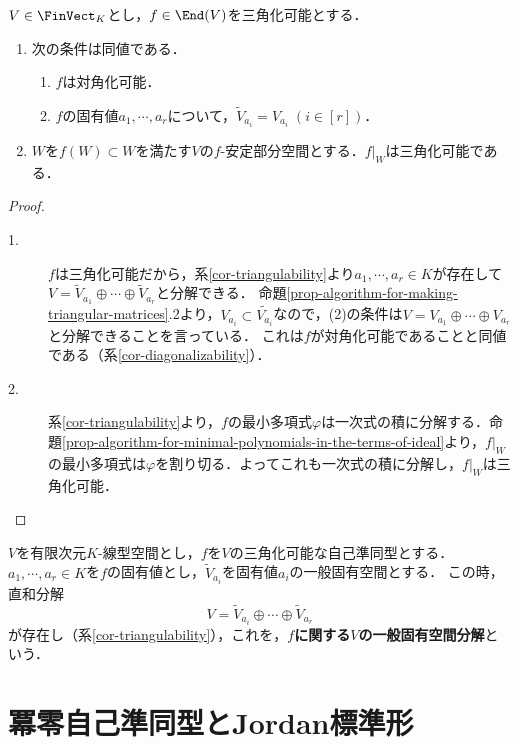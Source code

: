 \documentclass[uplatex, dvipdfmx]{jsreport}
\begin{document}
\begin{corollary}
    $V\in\FinVect_K$とし，$f\in\End(V)$を三角化可能とする．
    \begin{enumerate}
        \item 次の条件は同値である．
        \begin{enumerate}[(1)]
            \item $f$は対角化可能．
            \item $f$の固有値$a_1,\cdots,a_r$について，$\widetilde{V}_{a_i}=V_{a_i}\;(i\in[r])$．
        \end{enumerate}
        \item $W$を$f(W)\subset W$を満たす$V$の$f$-安定部分空間とする．$f|_W$は三角化可能である．
    \end{enumerate}
\end{corollary}
\begin{proof}\mbox{}
    \begin{description}
        \item[1.] $f$は三角化可能だから，系\ref{cor-triangulability}より$a_1,\cdots,a_r\in K$が存在して$V=\tilde{V}_{a_1}\oplus\cdots\oplus \tilde{V}_{a_r}$と分解できる．
        命題\ref{prop-algorithm-for-making-triangular-matrices}.2より，$V_{a_i}\subset\tilde{V_{a_i}}$なので，(2)の条件は$V=V_{a_1}\oplus\cdots\oplus V_{a_r}$と分解できることを言っている．
        これは$f$が対角化可能であることと同値である（系\ref{cor-diagonalizability}）．
        \item[2.] 系\ref{cor-triangulability}より，$f$の最小多項式$\varphi$は一次式の積に分解する．命題\ref{prop-algorithm-for-minimal-polynomials-in-the-terms-of-ideal}より，$f|_W$の最小多項式は$\varphi$を割り切る．よってこれも一次式の積に分解し，$f|_W$は三角化可能．
    \end{description}
\end{proof}

\begin{definition}
    $V$を有限次元$K$-線型空間とし，$f$を$V$の三角化可能な自己準同型とする．
    $a_1,\cdots,a_r\in K$を$f$の固有値とし，$\widetilde{V}_{a_i}$を固有値$a_i$の一般固有空間とする．
    この時，直和分解
    \[V=\widetilde{V}_{a_i}\oplus\cdots\oplus\widetilde{V}_{a_r}\]
    が存在し（系\ref{cor-triangulability}），これを，\textbf{$f$に関する$V$の一般固有空間分解}という．
\end{definition}

\section{冪零自己準同型とJordan標準形}
\end{document}

